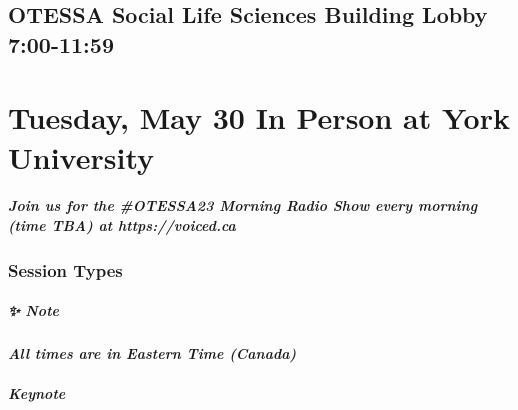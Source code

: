 \documentclass[
]{book}
\begin{document}
\hypertarget{otessa-social-life-sciences-building-lobby-700-1159}{%
\section*{OTESSA Social \textbar{} Life Sciences Building Lobby \textbar{} 7:00-11:59}\label{otessa-social-life-sciences-building-lobby-700-1159}}

\hypertarget{tuesday-may-30-in-person-at-york-university}{%
\chapter{Tuesday, May 30 \textbar{} In Person at York University}\label{tuesday-may-30-in-person-at-york-university}}

\begin{protip}
\hypertarget{join-us-for-the-otessa23-morning-radio-show-every-morning-time-tba-at-httpsvoiced.ca}{%
\paragraph{Join us for the \#OTESSA23 Morning Radio Show every morning
(time TBA) at
https://voiced.ca}\label{join-us-for-the-otessa23-morning-radio-show-every-morning-time-tba-at-httpsvoiced.ca}}
\end{protip}

\hypertarget{session-types-2}{%
\subsection*{Session Types}\label{session-types-2}}

\begin{protip}
\hypertarget{note}{%
\paragraph*{✨ Note}\label{note}}

\textbf{\emph{All times are in Eastern Time (Canada)}}
\end{protip}

\begin{keynote}
\hypertarget{keynote}{%
\paragraph{Keynote}\label{keynote}}
\end{keynote}
\end{document}

